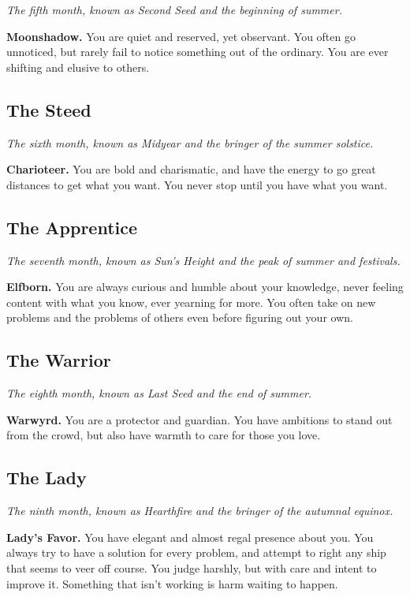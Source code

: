 \documentclass[12pt,letterpaper,twocolumn,openany,nodeprecatedcode,bg=none]{dndbook}
\let\oldsubsection\subsection
\renewcommand{\subsection}[1]{%
  \needspace{5\baselineskip}%
  \oldsubsection{#1}%
}
\begin{document}
\emph{The fifth month, known as Second Seed and the beginning of
summer.}

\textbf{Moonshadow.} You are quiet and reserved, yet observant. You
often go unnoticed, but rarely fail to notice something out of the
ordinary. You are ever shifting and elusive to others.

\subsection{The Steed}\label{the-steed}

\emph{The sixth month, known as Midyear and the bringer of the summer
solstice.}

\textbf{Charioteer.} You are bold and charismatic, and have the energy
to go great distances to get what you want. You never stop until you
have what you want.

\subsection{The Apprentice}\label{the-apprentice}

\emph{The seventh month, known as Sun's Height and the peak of summer
and festivals.}

\textbf{Elfborn.} You are always curious and humble about your
knowledge, never feeling content with what you know, ever yearning for
more. You often take on new problems and the problems of others even
before figuring out your own.

\subsection{The Warrior}\label{the-warrior}

\emph{The eighth month, known as Last Seed and the end of summer.}

\textbf{Warwyrd.} You are a protector and guardian. You have ambitions
to stand out from the crowd, but also have warmth to care for those you
love.

\subsection{The Lady}\label{the-lady}

\emph{The ninth month, known as Hearthfire and the bringer of the
autumnal equinox.}

\textbf{Lady's Favor.} You have elegant and almost regal presence about
you. You always try to have a solution for every problem, and attempt to
right any ship that seems to veer off course. You judge harshly, but
with care and intent to improve it. Something that isn't working is harm
waiting to happen.
\end{document}
